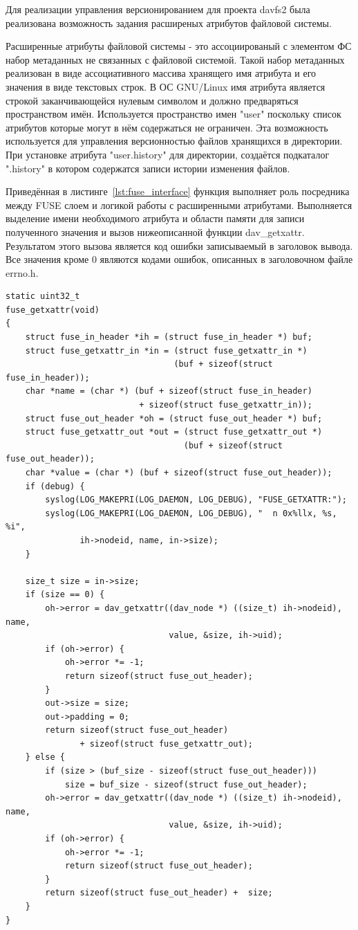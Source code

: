 \documentclass[utf8,usehyperref,12pt]{G7-32}
\begin{document}
Для реализации управления версионированием для проекта davfs2 была реализована возможность задания расширеных атрибутов файловой системы. 

Расширенные атрибуты файловой системы - это ассоциированый с элементом ФС набор метаданных не связанных с файловой системой. Такой набор метаданных реализован в виде ассоциативного массива хранящего имя атрибута и его значения в виде текстовых строк. В ОС GNU/Linux имя атрибута является строкой заканчивающейся нулевым символом и должно предваряться пространством имён. Используется пространство имен "user" поскольку список атрибутов которые могут в нём содержаться не ограничен. Эта возможность используется для управления версионностью файлов хранящихся в директории. При установке атрибута "user.history" для директории, создаётся подкаталог ".history" в котором содержатся записи истории изменения файлов.

Приведённая в листинге~\ref{lst:fuse_interface} функция выполняет роль посредника между FUSE слоем и логикой работы с расширенными атрибутами. Выполняется выделение имени необходимого атрибута и области памяти для записи полученного значения и вызов нижеописанной функции dav\_getxattr. Результатом этого вызова является код ошибки записываемый в заголовок вывода. Все значения кроме 0 являются кодами ошибок, описанных в заголовочном файле errno.h.
\lstset{language=C,caption=Взаимодействие с FUSE,label=lst:fuse_interface}
\begin{lstlisting}
static uint32_t
fuse_getxattr(void)
{
    struct fuse_in_header *ih = (struct fuse_in_header *) buf;
    struct fuse_getxattr_in *in = (struct fuse_getxattr_in *)
                                  (buf + sizeof(struct fuse_in_header));
    char *name = (char *) (buf + sizeof(struct fuse_in_header)
                           + sizeof(struct fuse_getxattr_in));
    struct fuse_out_header *oh = (struct fuse_out_header *) buf;
    struct fuse_getxattr_out *out = (struct fuse_getxattr_out *)
                                    (buf + sizeof(struct fuse_out_header));
    char *value = (char *) (buf + sizeof(struct fuse_out_header));
    if (debug) {
        syslog(LOG_MAKEPRI(LOG_DAEMON, LOG_DEBUG), "FUSE_GETXATTR:");
        syslog(LOG_MAKEPRI(LOG_DAEMON, LOG_DEBUG), "  n 0x%llx, %s, %i",
               ih->nodeid, name, in->size);
    }

    size_t size = in->size;
    if (size == 0) {
        oh->error = dav_getxattr((dav_node *) ((size_t) ih->nodeid), name,
                                 value, &size, ih->uid);
        if (oh->error) {
            oh->error *= -1;
            return sizeof(struct fuse_out_header);
        }
        out->size = size;
        out->padding = 0;
        return sizeof(struct fuse_out_header)
               + sizeof(struct fuse_getxattr_out);
    } else {
        if (size > (buf_size - sizeof(struct fuse_out_header)))
            size = buf_size - sizeof(struct fuse_out_header);
        oh->error = dav_getxattr((dav_node *) ((size_t) ih->nodeid), name,
                                 value, &size, ih->uid);
        if (oh->error) {
            oh->error *= -1;
            return sizeof(struct fuse_out_header);
        }
        return sizeof(struct fuse_out_header) +  size;
    }
}
\end{lstlisting}
\end{document}
